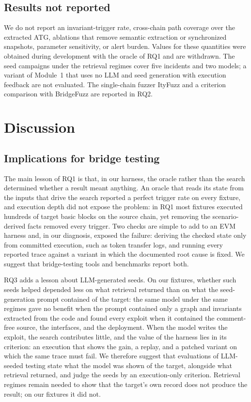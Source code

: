 \documentclass[a4paper]{cas-sc}
\begin{document}
\subsection{Results not reported}\label{sec:not-reported}

We do not report an invariant-trigger rate, cross-chain path coverage over the extracted ATG, ablations that remove semantic extraction or synchronized snapshots, parameter sensitivity, or alert burden. Values for these quantities were obtained during development with the oracle of RQ1 and are withdrawn. The seed campaigns under the retrieval regimes cover five incidents and two models; a variant of Module~1 that uses no LLM and seed generation with execution feedback are not evaluated. The single-chain fuzzer ItyFuzz and a criterion comparison with BridgeFuzz are reported in RQ2.

\section{Discussion}\label{sec:discussion}

\subsection{Implications for bridge testing}

The main lesson of RQ1 is that, in our harness, the oracle rather than the search determined whether a result meant anything. An oracle that reads its state from the inputs that drive the search reported a perfect trigger rate on every fixture, and execution depth did not expose the problem: in RQ1 most fixtures executed hundreds of target basic blocks on the source chain, yet removing the scenario-derived facts removed every trigger. Two checks are simple to add to an EVM harness and, in our diagnosis, exposed the failure: deriving the checked state only from committed execution, such as token transfer logs, and running every reported trace against a variant in which the documented root cause is fixed. We suggest that bridge-testing tools and benchmarks report both.

RQ3 adds a lesson about LLM-generated seeds. On our fixtures, whether such seeds helped depended less on what retrieval returned than on what the seed-generation prompt contained of the target: the same model under the same regimes gave no benefit when the prompt contained only a graph and invariants extracted from the code and found every exploit when it contained the comment-free source, the interfaces, and the deployment. When the model writes the exploit, the search contributes little, and the value of the harness lies in its criterion: an execution that shows the gain, a replay, and a patched variant on which the same trace must fail. We therefore suggest that evaluations of LLM-seeded testing state what the model was shown of the target, alongside what retrieval returned, and judge the seeds by an execution-only criterion. Retrieval regimes remain needed to show that the target's own record does not produce the result; on our fixtures it did not.
\end{document}

